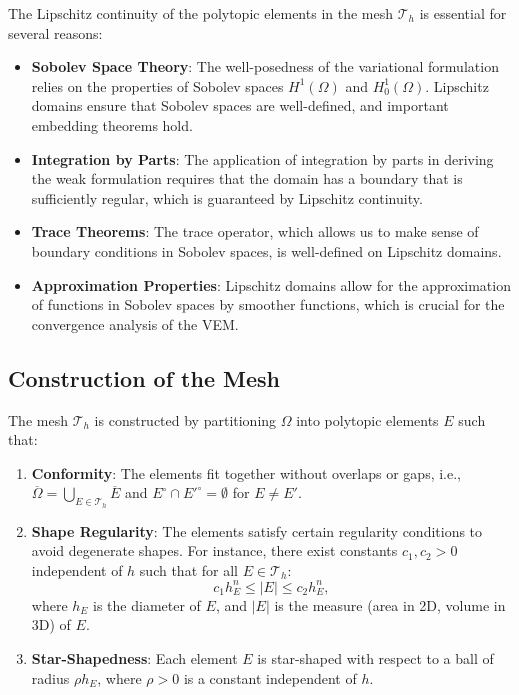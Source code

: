 \documentclass{article}
\begin{document}
The Lipschitz continuity of the polytopic elements in the mesh \( \mathcal{T}_h \) is essential for several reasons:

\begin{itemize}
    \item \textbf{Sobolev Space Theory}: The well-posedness of the variational formulation relies on the properties of Sobolev spaces \( H^1(\Omega) \) and \( H^1_0(\Omega) \). Lipschitz domains ensure that Sobolev spaces are well-defined, and important embedding theorems hold.
    \item \textbf{Integration by Parts}: The application of integration by parts in deriving the weak formulation requires that the domain has a boundary that is sufficiently regular, which is guaranteed by Lipschitz continuity.
    \item \textbf{Trace Theorems}: The trace operator, which allows us to make sense of boundary conditions in Sobolev spaces, is well-defined on Lipschitz domains.
    \item \textbf{Approximation Properties}: Lipschitz domains allow for the approximation of functions in Sobolev spaces by smoother functions, which is crucial for the convergence analysis of the VEM.
\end{itemize}

\subsection{Construction of the Mesh}

The mesh \( \mathcal{T}_h \) is constructed by partitioning \( \Omega \) into polytopic elements \( E \) such that:

\begin{enumerate}
    \item \textbf{Conformity}: The elements fit together without overlaps or gaps, i.e., \( \overline{\Omega} = \bigcup_{E \in \mathcal{T}_h} \overline{E} \) and \( E^\circ \cap E'^\circ = \emptyset \) for \( E \neq E' \).
    \item \textbf{Shape Regularity}: The elements satisfy certain regularity conditions to avoid degenerate shapes. For instance, there exist constants \( c_1, c_2 > 0 \) independent of \( h \) such that for all \( E \in \mathcal{T}_h \):
    \[
    c_1 h_E^n \leq |E| \leq c_2 h_E^n,
    \]
    where \( h_E \) is the diameter of \( E \), and \( |E| \) is the measure (area in 2D, volume in 3D) of \( E \).
    \item \textbf{Star-Shapedness}: Each element \( E \) is star-shaped with respect to a ball of radius \( \rho h_E \), where \( \rho > 0 \) is a constant independent of \( h \).
\end{enumerate}
\end{document}
